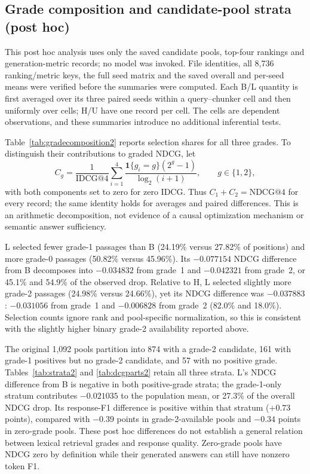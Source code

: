 \subsection{Grade composition and candidate-pool strata (post hoc)}
This post hoc analysis uses only the saved candidate pools, top-four rankings and generation-metric records; no model was invoked. File identities, all 8,736 ranking/metric keys, the full seed matrix and the saved overall and per-seed means were verified before the summaries were computed. Each B/L quantity is first averaged over its three paired seeds within a query--chunker cell and then uniformly over cells; H/U have one record per cell. The cells are dependent observations, and these summaries introduce no additional inferential tests.

Table~\ref{tab:gradecomposition2} reports selection shares for all three grades. To distinguish their contributions to graded NDCG, let
\[
C_g=\frac{1}{\mathrm{IDCG@4}}\sum_{i=1}^{4}\frac{\mathbf{1}\{g_i=g\}(2^g-1)}{\log_2(i+1)},\qquad g\in\{1,2\},
\]
with both components set to zero for zero IDCG. Thus $C_1+C_2=\mathrm{NDCG@4}$ for every record; the same identity holds for averages and paired differences. This is an arithmetic decomposition, not evidence of a causal optimization mechanism or semantic answer sufficiency.
\FloatBarrier

L selected fewer grade-1 passages than B (24.19\% versus 27.82\% of positions) and more grade-0 passages (50.82\% versus 45.96\%). Its $-0.077154$ NDCG difference from B decomposes into $-0.034832$ from grade~1 and $-0.042321$ from grade~2, or 45.1\% and 54.9\% of the observed drop. Relative to H, L selected slightly more grade-2 passages (24.98\% versus 24.66\%), yet its NDCG difference was $-0.037883$: $-0.031056$ from grade~1 and $-0.006828$ from grade~2 (82.0\% and 18.0\%). Selection counts ignore rank and pool-specific normalization, so this is consistent with the slightly higher binary grade-2 availability reported above.

The original 1,092 pools partition into 874 with a grade-2 candidate, 161 with grade-1 positives but no grade-2 candidate, and 57 with no positive grade. Tables~\ref{tab:strata2} and \ref{tab:dcgparts2} retain all three strata. L's NDCG difference from B is negative in both positive-grade strata; the grade-1-only stratum contributes $-0.021035$ to the population mean, or 27.3\% of the overall NDCG drop. Its response-F1 difference is positive within that stratum ($+0.73$ points), compared with $-0.39$ points in grade-2-available pools and $-0.34$ points in zero-grade pools. These post hoc differences do not establish a general relation between lexical retrieval grades and response quality. Zero-grade pools have NDCG zero by definition while their generated answers can still have nonzero token F1.
\FloatBarrier
\FloatBarrier

